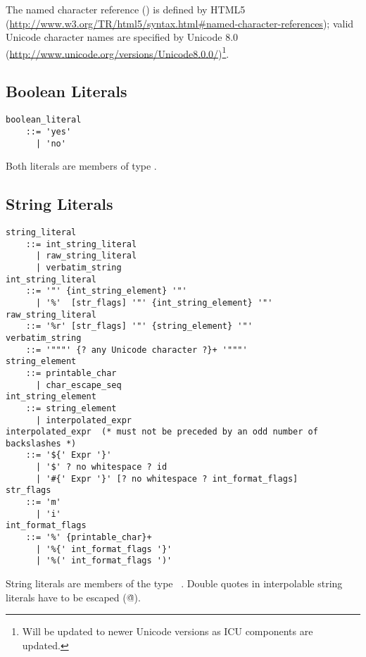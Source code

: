 The named character reference () is defined by HTML5 (\url{http://www.w3.org/TR/html5/syntax.html#named-character-references}); valid Unicode character names are specified by Unicode 8.0 (\url{http://www.unicode.org/versions/Unicode8.0.0/})\footnote{Will be updated to newer Unicode versions as ICU components are updated.}. 





\subsection{Boolean Literals}
\label{sec:booleanliterals}

\syntax\begin{lstlisting}
boolean_literal 
    ::= 'yes' 
      | 'no'
\end{lstlisting}

Both literals are members of type \lstinline@Boolean@. 





\subsection{String Literals}
\label{sec:stringliterals}

\syntax\begin{lstlisting}[mathescape=false,deletekeywords={no}]
string_literal 
    ::= int_string_literal
      | raw_string_literal
      | verbatim_string
int_string_literal 
    ::= '"' {int_string_element} '"'
      | '%'  [str_flags] '"' {int_string_element} '"'
raw_string_literal 
    ::= '%r' [str_flags] '"' {string_element} '"'
verbatim_string
    ::= '"""' {? any Unicode character ?}+ '"""'
string_element
    ::= printable_char 
      | char_escape_seq
int_string_element 
    ::= string_element 
      | interpolated_expr
interpolated_expr  (* must not be preceded by an odd number of backslashes *)
    ::= '${' Expr '}'
      | '$' ? no whitespace ? id
      | '#{' Expr '}' [? no whitespace ? int_format_flags]
str_flags 
    ::= 'm' 
      | 'i'
int_format_flags
    ::= '%' {printable_char}+
      | '%{' int_format_flags '}' 
      | '%(' int_format_flags ')' 
\end{lstlisting}

String literals are members of the type ~\lstinline@String@. Double quotes in interpolable string literals have to be escaped (\lstinline@\"@).

